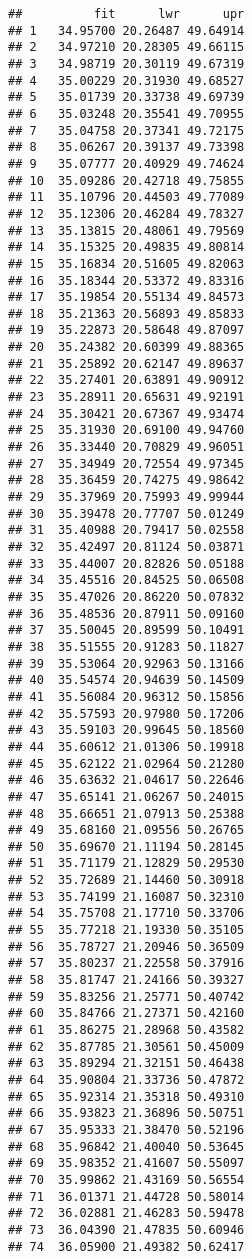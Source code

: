 \documentclass[]{article}
\begin{document}
\begin{verbatim}
##          fit      lwr      upr
## 1   34.95700 20.26487 49.64914
## 2   34.97210 20.28305 49.66115
## 3   34.98719 20.30119 49.67319
## 4   35.00229 20.31930 49.68527
## 5   35.01739 20.33738 49.69739
## 6   35.03248 20.35541 49.70955
## 7   35.04758 20.37341 49.72175
## 8   35.06267 20.39137 49.73398
## 9   35.07777 20.40929 49.74624
## 10  35.09286 20.42718 49.75855
## 11  35.10796 20.44503 49.77089
## 12  35.12306 20.46284 49.78327
## 13  35.13815 20.48061 49.79569
## 14  35.15325 20.49835 49.80814
## 15  35.16834 20.51605 49.82063
## 16  35.18344 20.53372 49.83316
## 17  35.19854 20.55134 49.84573
## 18  35.21363 20.56893 49.85833
## 19  35.22873 20.58648 49.87097
## 20  35.24382 20.60399 49.88365
## 21  35.25892 20.62147 49.89637
## 22  35.27401 20.63891 49.90912
## 23  35.28911 20.65631 49.92191
## 24  35.30421 20.67367 49.93474
## 25  35.31930 20.69100 49.94760
## 26  35.33440 20.70829 49.96051
## 27  35.34949 20.72554 49.97345
## 28  35.36459 20.74275 49.98642
## 29  35.37969 20.75993 49.99944
## 30  35.39478 20.77707 50.01249
## 31  35.40988 20.79417 50.02558
## 32  35.42497 20.81124 50.03871
## 33  35.44007 20.82826 50.05188
## 34  35.45516 20.84525 50.06508
## 35  35.47026 20.86220 50.07832
## 36  35.48536 20.87911 50.09160
## 37  35.50045 20.89599 50.10491
## 38  35.51555 20.91283 50.11827
## 39  35.53064 20.92963 50.13166
## 40  35.54574 20.94639 50.14509
## 41  35.56084 20.96312 50.15856
## 42  35.57593 20.97980 50.17206
## 43  35.59103 20.99645 50.18560
## 44  35.60612 21.01306 50.19918
## 45  35.62122 21.02964 50.21280
## 46  35.63632 21.04617 50.22646
## 47  35.65141 21.06267 50.24015
## 48  35.66651 21.07913 50.25388
## 49  35.68160 21.09556 50.26765
## 50  35.69670 21.11194 50.28145
## 51  35.71179 21.12829 50.29530
## 52  35.72689 21.14460 50.30918
## 53  35.74199 21.16087 50.32310
## 54  35.75708 21.17710 50.33706
## 55  35.77218 21.19330 50.35105
## 56  35.78727 21.20946 50.36509
## 57  35.80237 21.22558 50.37916
## 58  35.81747 21.24166 50.39327
## 59  35.83256 21.25771 50.40742
## 60  35.84766 21.27371 50.42160
## 61  35.86275 21.28968 50.43582
## 62  35.87785 21.30561 50.45009
## 63  35.89294 21.32151 50.46438
## 64  35.90804 21.33736 50.47872
## 65  35.92314 21.35318 50.49310
## 66  35.93823 21.36896 50.50751
## 67  35.95333 21.38470 50.52196
## 68  35.96842 21.40040 50.53645
## 69  35.98352 21.41607 50.55097
## 70  35.99862 21.43169 50.56554
## 71  36.01371 21.44728 50.58014
## 72  36.02881 21.46283 50.59478
## 73  36.04390 21.47835 50.60946
## 74  36.05900 21.49382 50.62417

\end{verbatim}
\end{document}

